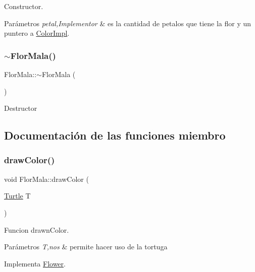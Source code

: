 Constructor. 
\begin{DoxyParams}{Parámetros}
{\em petal,Implementor} & es la cantidad de petalos que tiene la flor y un puntero a \hyperlink{classColorImpl}{Color\+Impl}. \\
\hline
\end{DoxyParams}
\mbox{\label{classFlorMala_ae85e1a4162127aad42b44d6609e5ce3f}} 
\subsubsection{\texorpdfstring{$\sim$\+Flor\+Mala()}{~FlorMala()}}
{\footnotesize\ttfamily Flor\+Mala\+::$\sim$\+Flor\+Mala (\begin{DoxyParamCaption}{ }\end{DoxyParamCaption})}

Destructor 

\subsection{Documentación de las funciones miembro}
\mbox{\label{classFlorMala_a23657c9a53aa5823c03c688d52d56e21}} 
\subsubsection{\texorpdfstring{draw\+Color()}{drawColor()}}
{\footnotesize\ttfamily void Flor\+Mala\+::draw\+Color (\begin{DoxyParamCaption}\item[{\hyperlink{classTurtle}{Turtle}}]{T }\end{DoxyParamCaption})\hspace{0.3cm}{\ttfamily [virtual]}}

Funcion drawn\+Color. 
\begin{DoxyParams}{Parámetros}
{\em T,nos} & permite hacer uso de la tortuga \\
\hline
\end{DoxyParams}


Implementa \hyperlink{classFlower_a23dd402c7227bf81c42d7e57772c15bf}{Flower}.

\mbox{\label{classFlorMala_aee0f20f3aa80d9ce3cb9c6fdbf036a7c}} 
